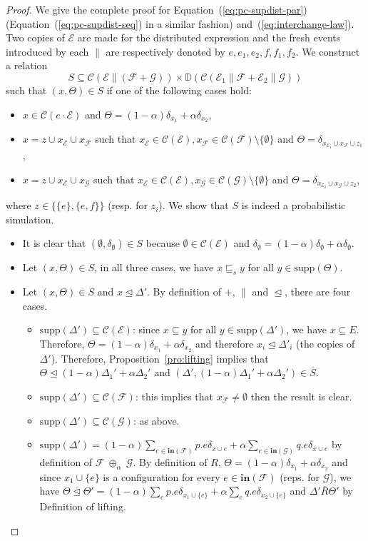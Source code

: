 \documentclass{llncs}
\newcommand{\C}{\mathcal{C}}
\newcommand{\D}{\mathbb{D}}
\newcommand{\EE}{\mathcal{E}}
\newcommand{\FF}{\mathcal{F}}
\newcommand{\G}{\mathcal{G}}
\newcommand{\refby}{\sqsubseteq}
\newcommand{\prefix}{\trianglelefteq}
\newcommand{\init}{\mathbf{in}}
\newcommand{\<}{\langle}
\renewcommand{\>}{\rangle}
\newcommand{\pc}[1]{{\ \oplus_{\!#1}\ }}
\newcommand{\supp}{\mathrm{supp}}
\newcommand{\ov}[1]{\overline{#1}}
\begin{document}
\begin{proof}
We give the complete proof for Equation~(\ref{eq:pc-supdist-par}) (Equation~(\ref{eq:pc-supdist-seq}) in a similar fashion) and~(\ref{eq:interchange-law}). Two copies of $\EE$ are made for the distributed expression and the fresh events introduced by each $\|$ are respectively denoted by $e,e_1,e_2,f,f_1,f_2$. We construct a relation 
$$S\subseteq\C(\EE\|(\FF+\G))\times\D(\C(\EE_1\|\FF+\EE_2\|\G))$$ such that $(x,\Theta)\in S$ if one of the following cases hold:
\begin{itemize}
\item $x\in\C(e\cdot \EE)$ and $\Theta = (1-\alpha)\delta_{x_1} + \alpha\delta_{x_2}$,
\item $x = z\cup x_\EE\cup x_\FF$ such that $x_\EE\in\C(\EE),x_\FF\in\C(\FF)\setminus\{\emptyset\}$ and $\Theta = \delta_{x_{\EE_1}\cup x_\FF\cup z_1}$,
\item $x = z\cup x_\EE\cup x_\G$ such that $x_\EE\in\C(\EE),x_\G\in\C(\G)\setminus\{\emptyset\}$ and $\Theta = \delta_{x_{\EE_2}\cup x_\G\cup z_2}$,
\end{itemize}
where $z\in\{\{e\},\{e,f\}\}$ (resp. for $z_i$). We show that $S$ is indeed a probabilistic simulation.
\begin{itemize}
\item It is clear that $(\emptyset,\delta_\emptyset)\in S$ because $\emptyset\in\C(\EE)$ and $\delta_\emptyset = (1-\alpha)\delta_\emptyset + \alpha\delta_\emptyset$.
\item Let $(x,\Theta)\in S$, in all three cases, we have $x\refby_s y$ for all $y\in\supp(\Theta)$.
\item Let $(x,\Theta)\in S$ and $x\prefix\Delta'$. By definition of $+$, $\|$ and $\prefix$, there are four cases.
\begin{itemize}
\item $\supp(\Delta')\subseteq\C(\EE)$: since $x\subseteq y$ for all $y\in\supp(\Delta')$, we have $x\subseteq E$. Therefore, $\Theta = (1-\alpha)\delta_{x_1}+\alpha\delta_{x_2}$ and therefore  $x_i\prefix\Delta'_i$ (the copies of $\Delta'$). Therefore, Proposition~\ref{pro:lifting} implies that $\Theta\prefix (1-\alpha)\Delta_1'+\alpha\Delta_2'$ and $(\Delta',(1-\alpha)\Delta_1'+\alpha\Delta_2')\in\ov S$.
\item $\supp(\Delta')\subseteq\C(\FF)$: this implies that $x_\FF \neq \emptyset$ then the result is clear. 
\item $\supp(\Delta')\subseteq\C(\G)$: as above.
\item $\supp(\Delta') = (1-\alpha)\sum_{e\in\init(\FF)}p.e\delta_{x\cup e} + \alpha\sum_{e\in\init(\G)}q.e\delta_{x\cup e}$ by definition of $\FF\pc{\alpha}\G$. By definition of $R$, $\Theta = (1-\alpha)\delta_{x_1} + \alpha\delta_{x_2}$ and since $x_1\cup\{e\}$ is a configuration for every $e\in\init(\FF)$ (reps. for $\G$), we have $\Theta\ov\prefix\Theta' = (1-\alpha)\sum_{e}p.e\delta_{x_1\cup \{e\}} + \alpha\sum_{e}q.e\delta_{x_2\cup\{e\}}$ and $\Delta'\ov R\Theta'$ by Definition of lifting.

\end{itemize}
\end{itemize}
\end{proof}
\end{document}

